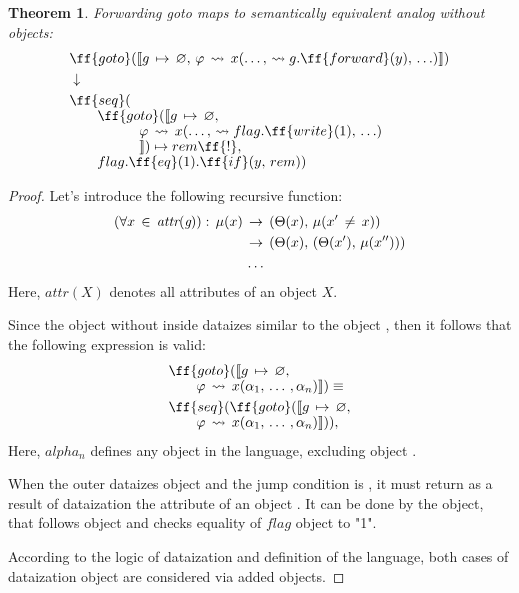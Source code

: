 \documentclass[sigplan,review,11pt,nonacm,natbib=false]{acmart}
\theoremstyle{theorems}
\newtheorem{eotheorem}{Theorem}
\newcommand\br{\\[-4pt]}
\begin{document}
\begin{eotheorem}
\emph{Forwarding goto} maps to semantically equivalent analog without  objects:
\begin{equation*}
\begin{split}
& \ff{goto}(\llbracket g\,\mapsto\,\varnothing,\,\varphi\,\leadsto\,x(\ldots,\,\leadsto g.\ff{forward}(y),\,\ldots)\rrbracket) \\
& \downarrow \\
& \ff{seq}( \br
& \quad \quad \ff{goto}(\llbracket g\,\mapsto\,\varnothing,\br
& \quad \quad \quad \quad \quad \varphi\,\leadsto\,x(\ldots,\,\leadsto flag.\ff{write}(1),\,\ldots)\br
& \quad \quad \quad \quad \quad \rrbracket)\mapsto rem\ff{!}, \br
& \quad \quad flag.\ff{eq}(1).\ff{if}(y,\,rem)) \\
\end{split}
\end{equation*}
\end{eotheorem}

\begin{proof}
Let's introduce the following recursive function:
\begin{equation}
\begin{split}
(\forall x\,\in\,\emph{attr}(\emph{g})):\,\mu(x)\,&\rightarrow\,(\Theta(x),\,\mu(x'\,\neq\,x)) \\
        &\rightarrow\,(\Theta(x),\,(\Theta(x'),\,\mu(x''))) \\
        &\ldots
\end{split}
\end{equation}
Here, $attr(X)$ denotes all attributes of an object $X$.

Since the object  without  inside dataizes similar to the object , then it follows that the following expression is valid:
\begin{equation}
\begin{split}
& \ff{goto}(\llbracket g\,\mapsto\,\varnothing,\br
& \quad \quad \varphi\,\leadsto\,x(\alpha_1,\,\ldots\,,\alpha_n)\rrbracket) \equiv \\
& \ff{seq}(\ff{goto}(\llbracket g\,\mapsto\,\varnothing,\br
& \quad \quad \varphi\,\leadsto\,x(\alpha_1,\,\ldots\,,\alpha_n)\rrbracket)),\\
\end{split}
\end{equation}
Here, $alpha_n$ defines any object in the language, excluding object .

When the outer  dataizes object  and the jump condition is , it must return as a result of dataization the attribute of an object .
It can be done by the  object, that follows object  and checks equality of $flag$ object to "1".

According to the logic of dataization and definition of the language, both cases of dataization object  are considered via added  objects.
\end{proof}
\end{document}
